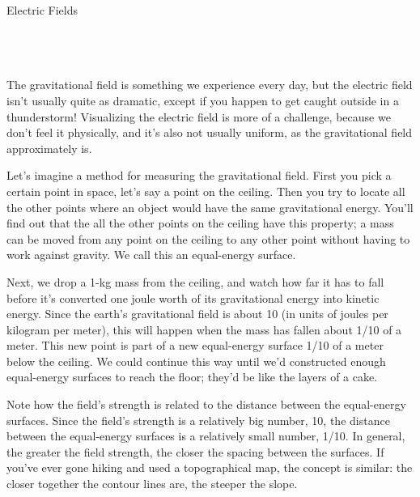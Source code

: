 \begin{lab}{Electric Fields}
\apparatus
{}\\
\\
\\
\\


\labintroduction

The gravitational field is something we experience every day, but the electric field
isn't usually quite as dramatic, except if you happen to get caught outside in a thunderstorm!
Visualizing the electric field is more of a challenge, because we don't feel it physically,
and it's also not usually uniform, as the gravitational field approximately is.

Let's imagine a method for measuring the gravitational field. First you pick a certain point
in space, let's say a point on the ceiling. Then you try to locate all the other points where an
object would have the same gravitational energy. You'll find out that the all the other points
on the ceiling have this property; a mass can be moved from any point on the ceiling to any
other point without having to work against gravity. We call this an equal-energy surface.

Next, we drop a 1-kg mass from the
ceiling, and watch how far it has to fall before it's converted one joule worth of its
gravitational energy into kinetic energy. Since the earth's gravitational field is about
10 (in units of joules per kilogram per meter), this will happen when the mass has fallen
about 1/10 of a meter. This new point is part of a new equal-energy surface 1/10 of a meter
below the ceiling. We could continue this way until we'd constructed enough equal-energy
surfaces to reach the floor; they'd be like the layers of a cake.

\enlargethispage{-\baselineskip}

Note how the field's strength is related to the distance between the equal-energy surfaces.
Since the field's strength is a relatively big number, 10, the distance between the
equal-energy surfaces is a relatively small number, 1/10. In general, the greater the field
strength, the closer the spacing between the surfaces. If you've ever gone hiking and
used a topographical map, the concept is similar: the closer together the contour lines
are, the steeper the slope.


\end{lab}
